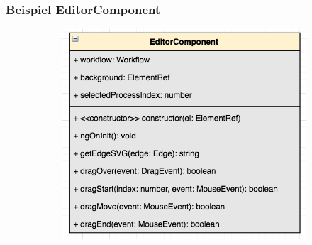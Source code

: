 \documentclass[11pt, usepdftitle=false,...]{beamer}
\begin{document}
    	\begin{frame}
    		\frametitle{Beispiel EditorComponent}
    		
    		\begin{figure}[h]
                \begin{subfigure}{0.3\textwidth}
                    \includegraphics[width=0.9\linewidth]{images/editor-1.png} 
                \end{subfigure}
                \begin{subfigure}{0.3\textwidth}

\end{subfigure}
\end{figure}
\end{frame}
\end{document}
